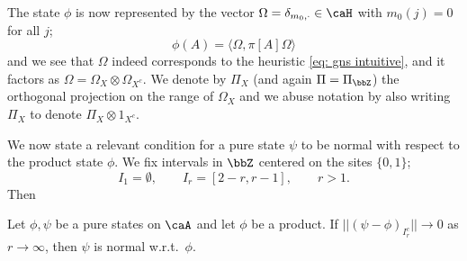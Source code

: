 %
%
The state $\phi$ is now represented by the vector $\Omega=\delta_{m_0,\cdot}\in\caH$ with $m_0(j)=0$ for all $j$; 
$$
\phi(A)=\langle\Omega, \pi[A]\Omega\rangle
$$
and we see that $\Omega$ indeed corresponds to the heuristic \eqref{eq: gns intuitive}, and it factors as $\Omega=\Omega_X\otimes\Omega_{X^c}$.  We denote by $\Pi_X$ (and again $\Pi = \Pi_\bbZ$) the orthogonal projection on the range of $\Omega_X$ and we abuse notation by also writing $\Pi_X$ to denote $\Pi_X\otimes 1_{X^c}$.




We now state a relevant condition for a pure state $\psi$ to be normal with respect to the product state $\phi$. We fix intervals in $\bbZ$ centered on the sites $\{0,1\}$;
\begin{equation}\label{eq: intervals} 
	I_1=\emptyset, \qquad I_r=[2-r,r-1],\qquad  r>1.
\end{equation}
Then
\begin{lemma}\label{lem: condition for normality}
	Let $\phi,\psi$ be a pure states on $\caA$ and let $\phi$ be a product.
	If $||(\psi-\phi)_{I_r^c}|| \to 0$ as $r\to \infty$, then $\psi$ is normal w.r.t.\ $\phi$. 
\end{lemma}
